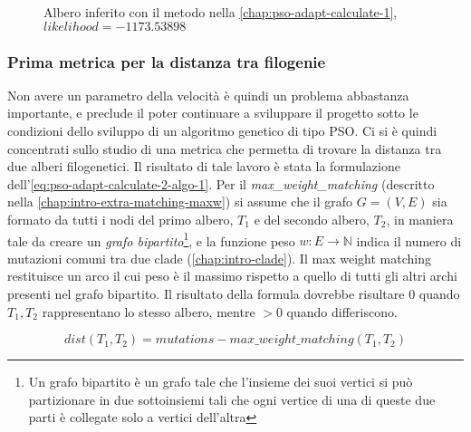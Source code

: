 \begin{figure}[!h]
  \centering
  \caption{Albero inferito con il metodo nella \autoref{chap:pso-adapt-calculate-1}, $likelihood = -1173.53898$}
  \label{fig:pso-adapt-calculate-1-tree}
\end{figure}

\subsubsection{Prima metrica per la distanza tra filogenie}
\label{chap:pso-adapt-calculate-2}
Non avere un parametro della velocità è quindi un problema abbastanza importante, e preclude il poter continuare a sviluppare il progetto sotto le condizioni dello sviluppo di un algoritmo genetico di tipo PSO.
Ci si è quindi concentrati sullo studio di una metrica che permetta di trovare la distanza tra due alberi filogenetici. Il risultato di tale lavoro è stata la formulazione dell'\autoref{eq:pso-adapt-calculate-2-algo-1}. Per il \textit{max\_weight\_matching} (descritto nella \autoref{chap:intro-extra-matching-maxw}) si assume che il grafo $G = (V, E)$ sia formato da tutti i nodi del primo albero, $T_1$ e del secondo albero, $T_2$, in maniera tale da creare un \textit{grafo bipartito}\footnote{Un grafo bipartito è un grafo tale che l'insieme dei suoi vertici si può partizionare in due sottoinsiemi tali che ogni vertice di una di queste due parti è collegate solo a vertici dell'altra}, e la funzione peso $w: E \rightarrow \mathbb{N}$ indica il numero di mutazioni comuni tra due clade (\autoref{chap:intro-clade}). Il max weight matching restituisce un arco il cui peso è il massimo rispetto a quello di tutti gli altri archi presenti nel grafo bipartito. Il risultato della formula dovrebbe risultare $0$ quando $T_1, T_2$ rappresentano lo stesso albero, mentre $> 0$ quando differiscono.

\begin{equation}
  \label{eq:pso-adapt-calculate-2-algo-1}
  dist(T_1, T_2) = mutations - max\_weight\_matching(T_1, T_2)
\end{equation}

